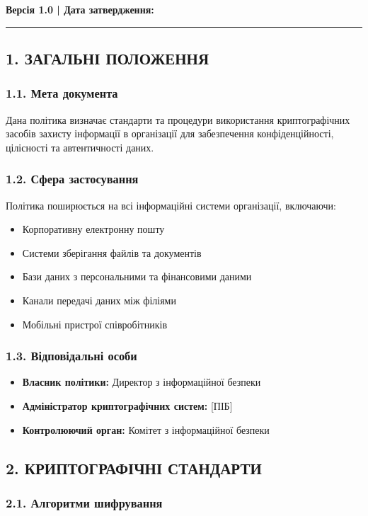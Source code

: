 \noindent
\textbf{Версія 1.0 | Дата затвердження:} \rule{4cm}{0.5pt}

\subsection*{1. ЗАГАЛЬНІ ПОЛОЖЕННЯ}

\subsubsection*{1.1. Мета документа}
Дана політика визначає стандарти та процедури використання криптографічних засобів захисту інформації в організації для забезпечення конфіденційності, цілісності та автентичності даних.

\subsubsection*{1.2. Сфера застосування}
Політика поширюється на всі інформаційні системи організації, включаючи:
\begin{itemize}
    \item Корпоративну електронну пошту
    \item Системи зберігання файлів та документів
    \item Бази даних з персональними та фінансовими даними
    \item Канали передачі даних між філіями
    \item Мобільні пристрої співробітників
\end{itemize}

\subsubsection*{1.3. Відповідальні особи}
\begin{itemize}
    \item \textbf{Власник політики:} Директор з інформаційної безпеки
    \item \textbf{Адміністратор криптографічних систем:} [ПІБ]
    \item \textbf{Контролюючий орган:} Комітет з інформаційної безпеки
\end{itemize}

\subsection*{2. КРИПТОГРАФІЧНІ СТАНДАРТИ}

\subsubsection*{2.1. Алгоритми шифрування}

